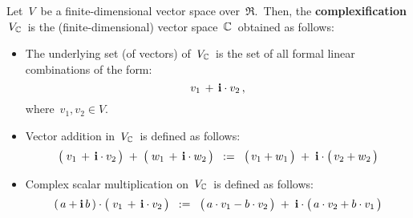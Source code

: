 \vskip 0.5cm
\begin{definition}
\mbox{}
\vskip 0.05cm
\noindent
Let \,$V$\, be a finite-dimensional vector space over \,$\Re$.\,
Then, the \textbf{complexification} \,$V_{\mathbb{C}}$\, is
the (finite-dimensional) vector space \,$\mathbb{C}$\, obtained as follows:
\begin{itemize}
\item
	The underlying set (of vectors) of \,$V_{\mathbb{C}}$\, is the set of all formal linear combinations
	of the form:
	\begin{equation*}
	v_{1} \, + \, \textnormal{\bf i}\cdot v_{2}\,,
	\end{equation*}
	where \,$v_{1}, v_{2} \in V$.\,
\item
	Vector addition in \,$V_{\mathbb{C}}$\, is defined as follows:
	\begin{equation*}
	\left(\;\overset{{\color{white}.}}{v_{1}} \, + \, \i\cdot v_{2}\,\right)
	\; + \;
	\left(\;\overset{{\color{white}.}}{w_{1}} \, + \, \i\cdot w_{2}\,\right)
	\;\; := \;\;
		\left(\,\overset{{\color{white}.}}{v_{1}} + w_{1} \,\right)
		\; + \;
		\i\cdot\left(\,\overset{{\color{white}.}}{v_{2}} + w_{2} \,\right)
	\end{equation*}	
\item
	Complex scalar multiplication on \,$V_{\mathbb{C}}$\, is defined as follows:
	\begin{equation*}
	(\,a + \i \, b\,) \cdot \left(\;\overset{{\color{white}.}}{v_{1}} \, + \, \i\cdot v_{2}\,\right)
	\;\; := \;\;
		\left(\,a\cdot\overset{{\color{white}.}}{v_{1}} - b \cdot v_{2} \,\right)
		\; + \;
		\i\cdot\left(\,a\cdot\overset{{\color{white}.}}{v_{2}} + b \cdot v_{1} \,\right)
	\end{equation*}	
\end{itemize}
\end{definition}


